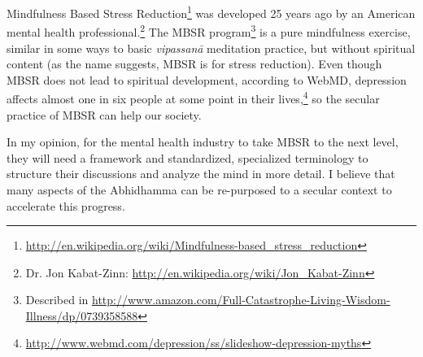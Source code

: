 \color{black}


Mindfulness Based Stress Reduction\footnote{\url{http://en.wikipedia.org/wiki/Mindfulness-based_stress_reduction}} was developed 25 years ago by an American mental health professional.\footnote{Dr. Jon Kabat-Zinn: \url{http://en.wikipedia.org/wiki/Jon_Kabat-Zinn}} The MBSR program\footnote{Described in \url{http://www.amazon.com/Full-Catastrophe-Living-Wisdom-Illness/dp/0739358588}} is a pure mindfulness exercise, similar in some ways to basic \textit{vipassanā} meditation practice, but without spiritual content (as the name suggests, MBSR is for stress reduction). Even though MBSR does not lead to spiritual development, according to WebMD, depression affects almost one in six people at some point in their lives,\footnote{\url{http://www.webmd.com/depression/ss/slideshow-depression-myths}} so the secular practice of MBSR can help our society. 

In my opinion, for the mental health industry to take MBSR to the next level, they will need a framework and standardized, specialized terminology to structure their discussions and analyze the mind in more detail. I believe that many aspects of the Abhidhamma can be re-purposed to a secular context to accelerate this progress.
